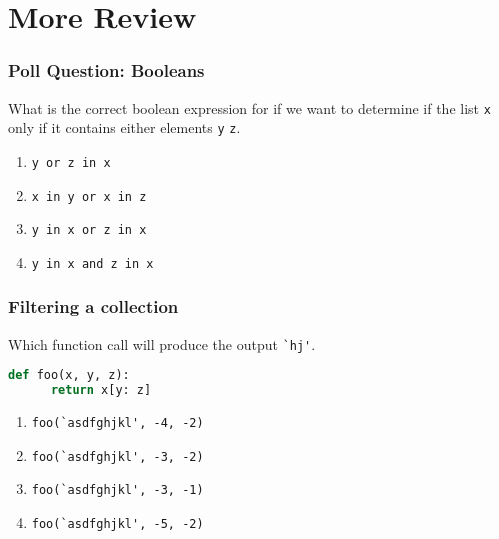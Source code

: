 \documentclass{beamer}
\begin{document}
\section{More Review}

%
%
\begin{frame}[fragile]
  \frametitle{Poll Question: Booleans}
  What is the correct boolean expression for if we want to determine if the list \lstinline|x| only if it contains either elements \lstinline|y| \lstinline|z|.
  \begin{enumerate}[A]
    \item \lstinline|y or z in x|
    \item \lstinline|x in y or x in z|
    \item \lstinline|y in x or z in x|
    \item \lstinline|y in x and z in x|
  \end{enumerate}
\end{frame}

%
%
\begin{frame}[fragile]
  \frametitle{Filtering a collection}
  Which function call will produce the output \lstinline|`hj'|.
  \begin{lstlisting}[language=Python, autogobble]
  def foo(x, y, z):
      return x[y: z]
  \end{lstlisting}
  \vfill
  \begin{enumerate}[A]
    \item \lstinline|foo(`asdfghjkl', -4, -2)|
    \item \lstinline|foo(`asdfghjkl', -3, -2)|
    \item \lstinline|foo(`asdfghjkl', -3, -1)|
    \item \lstinline|foo(`asdfghjkl', -5, -2)|
  \end{enumerate}
\end{frame}
\end{document}
